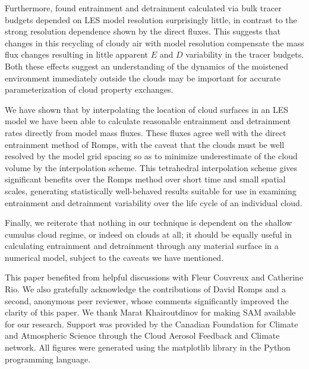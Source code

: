 \documentclass[12pt]{article}
\begin{document}
Furthermore, \cite{Brown1999} found entrainment and detrainment calculated via
bulk tracer budgets depended on LES model resolution surprisingly little, in 
contrast to the strong resolution dependence shown by the direct fluxes.
This suggests that changes in this recycling of cloudy air with model 
resolution compensate the mass flux changes resulting in little apparent $E$ 
and $D$ variability in the tracer budgets.  Both these effects suggest an 
understanding of the dynamics of the moistened environment immediately outside 
the clouds may be important for accurate parameterization of cloud property 
exchanges.

We have shown that by interpolating the location of cloud surfaces in an LES
model we have been able to calculate reasonable entrainment and detrainment 
rates directly from model mass fluxes.  These fluxes agree well with the 
direct entrainment method of Romps, with the caveat that the clouds must be 
well resolved by the model grid spacing so as to minimize underestimate of the 
cloud volume by the interpolation scheme.  This tetrahedral interpolation 
scheme gives significant benefits over the Romps method over short time and 
small spatial scales, generating statistically well-behaved results suitable 
for use in examining entrainment and detrainment variability over the life 
cycle of an individual cloud.

Finally, we reiterate that nothing in our technique is dependent on the shallow 
cumulus cloud regime, or indeed on clouds at all; it should be equally useful
in calculating entrainment and detrainment through any material surface in a 
numerical model, subject to the caveats we have mentioned.


\begin{acknowledgment}
This paper benefited from helpful discussions with Fleur Couvreux and 
Catherine Rio.  We also gratefully acknowledge the contributions of David 
Romps and a second, anonymous peer reviewer, whose comments significantly 
improved the clarity of this paper.  We thank Marat Khairoutdinov for making 
SAM available for our research.  Support was provided by the Canadian 
Foundation for Climate and Atmospheric Science through the Cloud Aerosol 
Feedback and Climate network.  All figures were generated using the matplotlib 
library in the Python programming language.
\end{acknowledgment}
\end{document}
